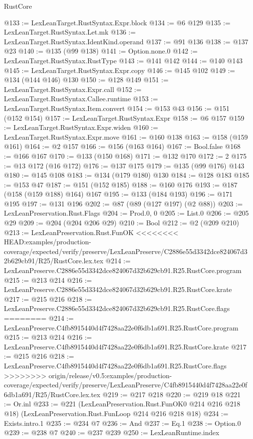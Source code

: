 \begin{lexlean}{RustCore}
\begin{coremodule}
{\begin{coremodule}
{{{{{@133 := LexLeanTarget.RustSyntax.Expr.block
@134 := @6 @129
@135 := LexLeanTarget.RustSyntax.Let.mk
@136 := LexLeanTarget.RustSyntax.IdentKind.operand
@137 := @91 @136
@138 := @137 @23
@140 := @135 (@99 @138)
@141 := Option.none.{0}
@142 := LexLeanTarget.RustSyntax.RustType
@143 := @141 @142
@144 := @140 @143
@145 := LexLeanTarget.RustSyntax.Expr.copy
@146 := @145 @102
@149 := @134 (@144 @146) @130
@150 := @128 @149
@151 := LexLeanTarget.RustSyntax.Expr.call
@152 := LexLeanTarget.RustSyntax.Callee.runtime
@153 := LexLeanTarget.RustSyntax.Item.convert
@154 := @153 @43
@156 := @151 (@152 @154)
@157 := LexLeanTarget.RustSyntax.Expr
@158 := @6 @157
@159 := LexLeanTarget.RustSyntax.Expr.widen
@160 := LexLeanTarget.RustSyntax.Expr.move
@161 := @160 @138
@163 := @158 (@159 @161)
@164 := @2 @157
@166 := @156 (@163 @164)
@167 := Bool.false
@168 := @166 @167
@170 := @133 (@150 @168)
@171 := @132 @170
@172 := 2
@175 := @13 @172 (@16 @172)
@176 := @137 @175
@179 := @135 (@99 @176) @143
@180 := @145 @108
@183 := @134 (@179 @180) @130
@184 := @128 @183
@185 := @153 @47
@187 := @151 (@152 @185)
@188 := @160 @176
@193 := @187 (@158 (@159 @188) @164) @167
@195 := @133 (@184 @193)
@196 := @171 @195
@197 := @131 @196
@202 := @87 (@89 (@127 @197) (@2 @88))
@203 := LexLeanPreservation.Rust.Flags
@204 := Prod.{0, 0}
@205 := List.{0}
@206 := @205 @29
@209 := @204 (@204 @206 @29)
@210 := Bool
@212 := @2 (@209 @210)
@213 := LexLeanPreservation.Rust.FunOK
<<<<<<<< HEAD:examples/production-coverage/expected/verify/preserve/LexLeanPreserve/C2886e55d3342dce824067d32b629cb91/R25/RustCore.lex.tex
@214 := LexLeanPreserve.C2886e55d3342dce824067d32b629cb91.R25.RustCore.program
@215 := @213 @214
@216 := LexLeanPreserve.C2886e55d3342dce824067d32b629cb91.R25.RustCore.krate
@217 := @215 @216
@218 := LexLeanPreserve.C2886e55d3342dce824067d32b629cb91.R25.RustCore.flags
========
@214 := LexLeanPreserve.C4fb8915440d4f7428aa22e0f6db1a691.R25.RustCore.program
@215 := @213 @214
@216 := LexLeanPreserve.C4fb8915440d4f7428aa22e0f6db1a691.R25.RustCore.krate
@217 := @215 @216
@218 := LexLeanPreserve.C4fb8915440d4f7428aa22e0f6db1a691.R25.RustCore.flags
>>>>>>>> origin/release/v0.5:examples/production-coverage/expected/verify/preserve/LexLeanPreserve/C4fb8915440d4f7428aa22e0f6db1a691/R25/RustCore.lex.tex
@219 := @217 @218
@220 := @219 @18
@221 := Or.inl
@233 := @221
    (LexLeanPreservation.Rust.FunOK0 @214 @216 @218 @18)
    (LexLeanPreservation.Rust.FunLoop @214 @216 @218 @18)
@234 := Exists.intro.{1}
@235 := @234 @7
@236 := And
@237 := Eq.{1}
@238 := Option.{0}
@239 := @238 @7
@240 := @237 @239
@250 := LexLeanRuntime.index
}}}}}
\end{coremodule}}
\end{coremodule}
\end{lexlean}
